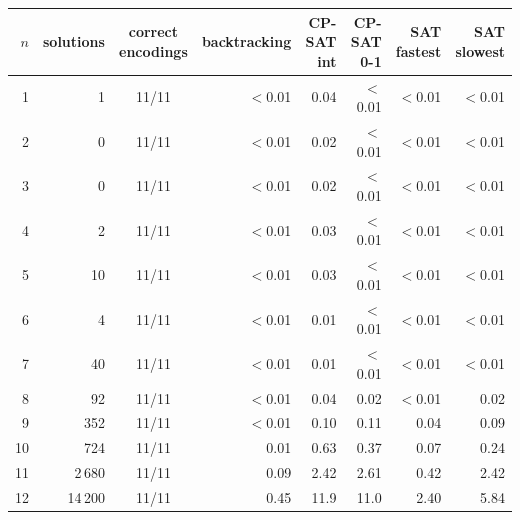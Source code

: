 \begin{tabular}{@{}rrcrrrrr@{}}
\toprule
$n$ & solutions & correct encodings & backtracking & CP-SAT int & CP-SAT 0-1 & SAT fastest & SAT slowest \\
\midrule
1 & 1 & 11/11 & $<$0.01 & 0.04 & $<$0.01 & $<$0.01 & $<$0.01 \\
2 & 0 & 11/11 & $<$0.01 & 0.02 & $<$0.01 & $<$0.01 & $<$0.01 \\
3 & 0 & 11/11 & $<$0.01 & 0.02 & $<$0.01 & $<$0.01 & $<$0.01 \\
4 & 2 & 11/11 & $<$0.01 & 0.03 & $<$0.01 & $<$0.01 & $<$0.01 \\
5 & 10 & 11/11 & $<$0.01 & 0.03 & $<$0.01 & $<$0.01 & $<$0.01 \\
6 & 4 & 11/11 & $<$0.01 & 0.01 & $<$0.01 & $<$0.01 & $<$0.01 \\
7 & 40 & 11/11 & $<$0.01 & 0.01 & $<$0.01 & $<$0.01 & $<$0.01 \\
8 & 92 & 11/11 & $<$0.01 & 0.04 & 0.02 & $<$0.01 & 0.02 \\
9 & 352 & 11/11 & $<$0.01 & 0.10 & 0.11 & 0.04 & 0.09 \\
10 & 724 & 11/11 & 0.01 & 0.63 & 0.37 & 0.07 & 0.24 \\
11 & 2\,680 & 11/11 & 0.09 & 2.42 & 2.61 & 0.42 & 2.42 \\
12 & 14\,200 & 11/11 & 0.45 & 11.9 & 11.0 & 2.40 & 5.84 \\
\bottomrule
\end{tabular}
